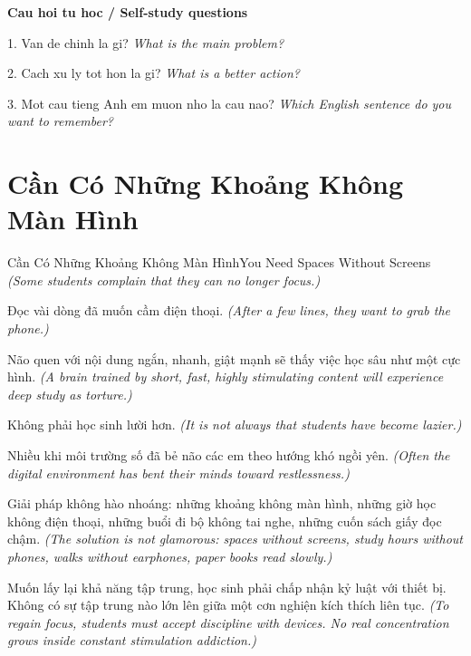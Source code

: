 \begin{tuhocnhanh}
\textbf{Cau hoi tu hoc / Self-study questions}

1. Van de chinh la gi? \textit{What is the main problem?}

2. Cach xu ly tot hon la gi? \textit{What is a better action?}

3. Mot cau tieng Anh em muon nho la cau nao? \textit{Which English sentence do you want to remember?}
\end{tuhocnhanh}
\ngancach

\section{Cần Có Những Khoảng Không Màn Hình}
\begin{truyen}{Cần Có Những Khoảng Không Màn Hình}{You Need Spaces Without Screens}
\textit{(Some students complain that they can no longer focus.)}

Đọc vài dòng đã muốn cầm điện thoại.
\textit{(After a few lines, they want to grab the phone.)}

Não quen với nội dung ngắn, nhanh, giật mạnh sẽ thấy việc học sâu như một cực hình.
\textit{(A brain trained by short, fast, highly stimulating content will experience deep study as torture.)}

Không phải học sinh lười hơn.
\textit{(It is not always that students have become lazier.)}

Nhiều khi môi trường số đã bẻ não các em theo hướng khó ngồi yên.
\textit{(Often the digital environment has bent their minds toward restlessness.)}

Giải pháp không hào nhoáng: những khoảng không màn hình, những giờ học không điện thoại, những buổi đi bộ không tai nghe, những cuốn sách giấy đọc chậm.
\textit{(The solution is not glamorous: spaces without screens, study hours without phones, walks without earphones, paper books read slowly.)}

\end{truyen}

\begin{baihoc}
Muốn lấy lại khả năng tập trung, học sinh phải chấp nhận kỷ luật với thiết bị. Không có sự tập trung nào lớn lên giữa một cơn nghiện kích thích liên tục.
\textit{(To regain focus, students must accept discipline with devices. No real concentration grows inside constant stimulation addiction.)}
\end{baihoc}


